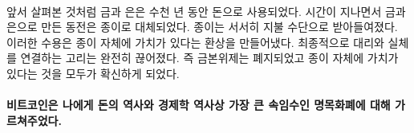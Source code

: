 \paragraph{}
\begin{comment}
	As we have seen, gold and silver were used as money for millennia. Over
	time, coins made from gold and silver were replaced by paper. Paper
	slowly became accepted as payment. This acceptance created an
	illusion --- the illusion that the paper itself has value. The final
	move was to completely sever the link between the representation and the
	actual: abolishing the gold standard and convincing everyone that the
	paper in itself is precious.
\end{comment}
앞서 살펴본 것처럼 금과 은은 수천 년 동안 돈으로 사용되었다. 
시간이 지나면서 금과 은으로 만든 동전은 종이로 대체되었다. 
종이는 서서히 지불 수단으로 받아들여졌다. 
이러한 수용은 종이 자체에 가치가 있다는 환상을 만들어냈다. 
최종적으로 대리와 실체를 연결하는 고리는 완전히 끊어졌다.
즉 금본위제는 폐지되었고 종이 자체에 가치가 있다는 것을 모두가 확신하게 되었다.

\begin{comment}
	\paragraph{Bitcoin taught me about the history of money and the greatest sleight of
		hand in the history of economics: fiat currency.}
\end{comment}
\paragraph{비트코인은 나에게 돈의 역사와 경제학 역사상 가장 큰 속임수인 명목화폐에 대해 가르쳐주었다.}

%
%
%
%
